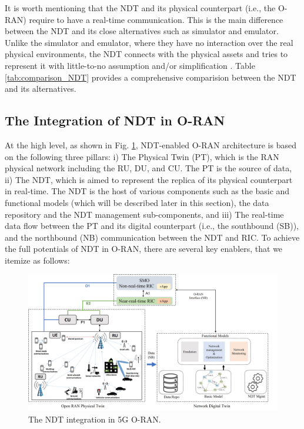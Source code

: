 \documentclass[]{IEEEtran}
\begin{document}
It is worth mentioning that the NDT and its physical counterpart (i.e., the O-RAN) require to have a real-time  communication. This is the main difference between the NDT and its close alternatives such as simulator and emulator. Unlike the simulator and emulator, where they have no interaction over the real physical environments, the NDT connects with the physical assets and tries to represent it with little-to-no assumption and/or simplification \cite{9220177}. Table \ref{tab:comparison_NDT} provides a comprehensive comparision between the NDT and its alternatives.


\subsection{The Integration of NDT in O-RAN }
At the high level, as shown in Fig. \ref{fig:NDT_Comp}, NDT-enabled O-RAN architecture is based on the following three pillars: i) The Physical Twin (PT), which is the RAN physical network including the RU, DU, and CU. The PT is the source of data,  ii) The NDT, which is aimed to represent the replica of its physical counterpart in  real-time. The NDT is the host of  various components such as the basic and functional models (which will be described later in this section), the data repository and the NDT management sub-components, and iii) The real-time data flow between the PT and its digital counterpart (i.e., the southbound (SB)), and the northbound (NB) communication between the NDT and RIC. To achieve the full potentials of NDT in O-RAN, there are several key enablers, that we itemize as follows:

\begin{figure}[t]
	\centering
	\includegraphics[width=1.0\linewidth]{NDT_comp}
	\caption{The NDT integration in 5G O-RAN.}
	\label{fig:NDT_Comp}
\end{figure}
\end{document}
